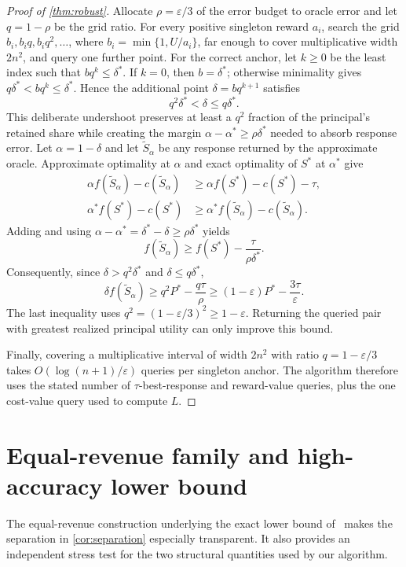 \documentclass[11pt]{article}
\newcommand{\eps}{\varepsilon}
\begin{document}
\begin{proof}[Proof of \cref{thm:robust}]
Allocate $\rho=\eps/3$ of the error budget to oracle error and let
$q=1-\rho$ be the grid ratio.  For every positive singleton reward
$a_i$, search the grid $b_i,b_iq,b_iq^2,\ldots$, where
$b_i=\min\{1,U/a_i\}$, far enough to cover multiplicative width $2n^2$,
and query one further point.  For the correct anchor, let $k\geq0$ be the
least index such that $bq^k\leq\delta^*$.  If $k=0$, then $b=\delta^*$;
otherwise minimality gives $q\delta^*<bq^k\leq\delta^*$.  Hence the
additional point $\delta=bq^{k+1}$ satisfies
\[
                         q^2\delta^*<\delta\leq q\delta^*. \tag{11}
\]
This deliberate undershoot preserves at least a $q^2$ fraction of the
principal's retained share while creating the margin
$\alpha-\alpha^*\geq\rho\delta^*$ needed to absorb response error.
Let $\alpha=1-\delta$ and let $\widetilde S_\alpha$ be any response returned
by the approximate oracle.  Approximate optimality at $\alpha$ and exact
optimality of $S^*$ at $\alpha^*$ give
\begin{align*}
\alpha f(\widetilde S_\alpha)-c(\widetilde S_\alpha)
 &\geq \alpha f(S^*)-c(S^*)-\tau,\\
\alpha^*f(S^*)-c(S^*)
 &\geq \alpha^*f(\widetilde S_\alpha)
          -c(\widetilde S_\alpha).
\end{align*}
Adding and using
$\alpha-\alpha^*=\delta^*-\delta\geq\rho\delta^*$ yields
\[
f(\widetilde S_\alpha)
\geq f(S^*)-\frac{\tau}{\rho\delta^*}.
\]
Consequently, since $\delta>q^2\delta^*$ and $\delta\leq q\delta^*$,
\[
\delta f(\widetilde S_\alpha)
 \geq q^2P^*-\frac{q\tau}{\rho}
 \geq (1-\eps)P^*-\frac{3\tau}{\eps}.
\]
The last inequality uses $q^2=(1-\eps/3)^2\geq1-\eps$.
Returning the queried pair with greatest realized principal utility can
only improve this bound.

Finally, covering a multiplicative interval of width $2n^2$ with ratio
$q=1-\eps/3$ takes $O(\log(n+1)/\eps)$ queries per singleton anchor.  The
algorithm therefore uses the stated number of $\tau$-best-response and
reward-value queries, plus the one cost-value query used to compute $L$.
\end{proof}

\clearpage
\section{Equal-revenue family and high-accuracy lower bound}
\label{app:high-accuracy}\label{sec:hard-instance}

The equal-revenue construction underlying the exact lower bound
of~\cite{DFGR26} makes the separation in \cref{cor:separation} especially
transparent.  It also provides an independent stress test for the two
structural quantities used by our algorithm.
\end{document}

